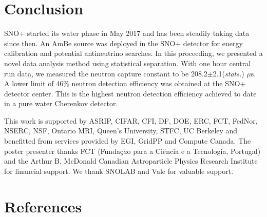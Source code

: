 \documentclass[a4paper]{jpconf}
\begin{document}
\section{Conclusion}

SNO+ started its water phase in May 2017 and has been steadily taking data since then. An AmBe source was deployed in the SNO+ detector for energy calibration and potential antineutrino searches. In this proceeding, we presented a novel data analysis method using statistical separation. With one hour central run data, we measured the neutron capture constant to be 208.2$\pm$2.1(\textit{stats.}) $\mu$s. A lower limit of 46\% neutron detection efficiency was obtained at the SNO+ detector center. This is the highest neutron detection efficiency achieved to date in a pure water Cherenkov detector. 


\ack{}

This work is supported by ASRIP, CIFAR, CFI, DF, DOE, ERC, FCT, FedNor, NSERC, NSF, Ontario MRI, Queen's University, STFC, UC Berkeley and benefitted from services provided by EGI, GridPP and Compute Canada. The poster presenter thanks FCT (Funda\c{c}$\tilde{a}$o para a Ci$\hat{e}$ncia e a Tecnologia, Portugal) and the Arthur B. McDonald Canadian Astroparticle Physics Research Institute for financial support. We thank SNOLAB and Vale for valuable support.

\section*{References}


\end{document}
